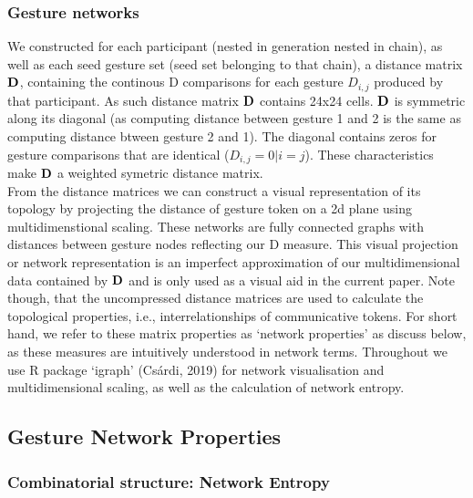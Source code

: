 \documentclass[
  man, noextraspace,floatsintext]{apa6}
\begin{document}
\hypertarget{gesture-networks}{%
\subsubsection{Gesture networks}\label{gesture-networks}}

We constructed for each participant (nested in generation nested in chain), as well as each seed gesture set (seed set belonging to that chain), a distance matrix \(\textbf{\mbox{D}}\), containing the continous D comparisons for each gesture \(D_{i,j}\) produced by that participant. As such distance matrix \(\textbf{\mbox{D}}\) contains 24x24 cells. \(\textbf{\mbox{D}}\) is symmetric along its diagonal (as computing distance between gesture 1 and 2 is the same as computing distance btween gesture 2 and 1). The diagonal contains zeros for gesture comparisons that are identical (\(D_{i,j} = 0 | i=j\)). These characteristics make \(\textbf{\mbox{D}}\) a weighted symetric distance matrix.\\
From the distance matrices we can construct a visual representation of its topology by projecting the distance of gesture token on a 2d plane using multidimenstional scaling. These networks are fully connected graphs with distances between gesture nodes reflecting our D measure. This visual projection or network representation is an imperfect approximation of our multidimensional data contained by \(\textbf{\mbox{D}}\) and is only used as a visual aid in the current paper. Note though, that the uncompressed distance matrices are used to calculate the topological properties, i.e., interrelationships of communicative tokens. For short hand, we refer to these matrix properties as `network properties' as discuss below, as these measures are intuitively understood in network terms. Throughout we use R package `igraph' (Csárdi, 2019) for network visualisation and multidimensional scaling, as well as the calculation of network entropy.

\hypertarget{gesture-network-properties}{%
\subsection{Gesture Network Properties}\label{gesture-network-properties}}

\hypertarget{combinatorial-structure-network-entropy}{%
\subsubsection{Combinatorial structure: Network Entropy}\label{combinatorial-structure-network-entropy}}
\end{document}
